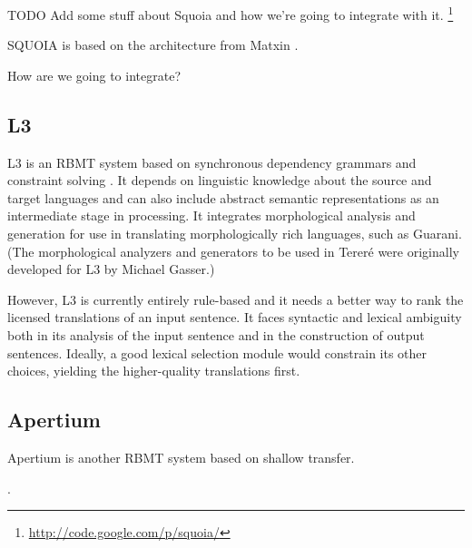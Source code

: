 TODO Add some stuff about Squoia and how we're going to integrate with it.
\cite{riosgonzales-gohring:2013:HyTra}
\footnote{\url{http://code.google.com/p/squoia/}}


SQUOIA is based on the architecture from Matxin \cite{matxin_2005}. 

How are we going to integrate?

\subsection{L3}

\cite{gasser:sxdg}

L3 is an RBMT system based on synchronous dependency grammars and constraint
solving \cite{gasser:sxdg,gasser:aflat2012}.
It depends on linguistic knowledge about the source and target languages and
can also include abstract semantic representations as an intermediate stage in
processing. It integrates morphological analysis and generation for use in
translating morphologically rich languages, such as Guarani.
(The morphological analyzers and generators to be used in Tereré were
originally developed for L3 by Michael Gasser.)

However, L3 is currently entirely rule-based and it needs a better way to rank
the licensed translations of an input sentence. It faces syntactic and lexical
ambiguity both in its analysis of the input sentence and in the construction of
output sentences. Ideally, a good lexical selection module would constrain its
other choices, yielding the higher-quality translations first.

\subsection{Apertium}
Apertium is another RBMT system based on shallow transfer.

\cite{Forcada_theapertium}.
